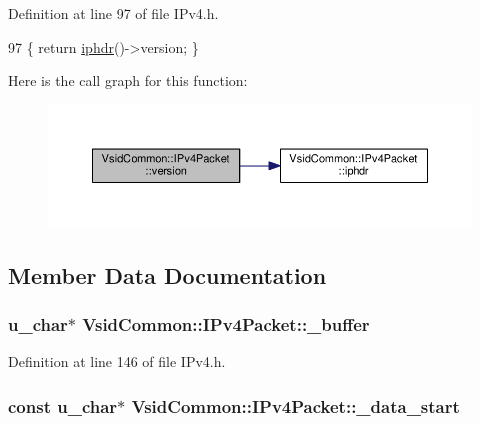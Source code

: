 Definition at line 97 of file I\-Pv4.\-h.


\begin{DoxyCode}
97 \{ \textcolor{keywordflow}{return} \hyperlink{class_vsid_common_1_1_i_pv4_packet_af3c00b2854ad766cf194bf12c99da86c}{iphdr}()->version; \}
\end{DoxyCode}


Here is the call graph for this function\-:
\nopagebreak
\begin{figure}[H]
\begin{center}
\leavevmode
\includegraphics[width=350pt]{class_vsid_common_1_1_i_pv4_packet_afc572d33e3813745c3a7c97e5adb444e_cgraph}
\end{center}
\end{figure}




\subsection{Member Data Documentation}
\hypertarget{class_vsid_common_1_1_i_pv4_packet_a935c6b0cb3c3a0d4a90d825d68088c3a}{
\subsubsection[{\-\_\-buffer}]{\setlength{\rightskip}{0pt plus 5cm}u\-\_\-char$\ast$ Vsid\-Common\-::\-I\-Pv4\-Packet\-::\-\_\-buffer\hspace{0.3cm}{\ttfamily [protected]}}}\label{class_vsid_common_1_1_i_pv4_packet_a935c6b0cb3c3a0d4a90d825d68088c3a}


Definition at line 146 of file I\-Pv4.\-h.

\hypertarget{class_vsid_common_1_1_i_pv4_packet_a2caca73de76d8c86e9a003c459188b81}{
\subsubsection[{\-\_\-data\-\_\-start}]{\setlength{\rightskip}{0pt plus 5cm}const u\-\_\-char$\ast$ Vsid\-Common\-::\-I\-Pv4\-Packet\-::\-\_\-data\-\_\-start\hspace{0.3cm}{\ttfamily [protected]}}}\label{class_vsid_common_1_1_i_pv4_packet_a2caca73de76d8c86e9a003c459188b81}


